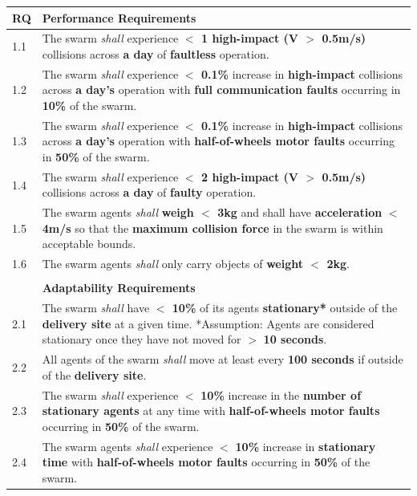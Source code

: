 \documentclass[runningheads]{llncs}
\begin{document}
\begin{table}[!t]
	\centering
	\begin{tabular}{p{5mm} p{120mm} }
		\textbf{RQ} & \textbf{Performance Requirements}\\
		\hline
		1.1 & The swarm \emph{shall} experience \textbf{$<$ 1 high-impact (V $>$ 0.5m/s)} collisions across \textbf{a day} of \textbf{faultless} operation. \\ 
		\hline
		1.2 & The swarm \emph{shall} experience \textbf{$<$ 0.1\%} increase in \textbf{high-impact} collisions across \textbf{a day's} operation with \textbf{full communication faults} occurring in \textbf{10\%} of the swarm.\\ 
		\hline
		1.3 & The swarm \emph{shall} experience \textbf{$<$ 0.1\%} increase in \textbf{high-impact} collisions across \textbf{a day's} operation with \textbf{half-of-wheels motor faults} occurring in \textbf{50\%} of the swarm.	\\	
		\hline
		1.4 & The swarm \emph{shall} experience \textbf{$<$ 2 high-impact (V $>$ 0.5m/s)} collisions across \textbf{a day} of \textbf{faulty} operation.  \\		 		
		\hline
        1.5 & The swarm agents \emph{shall} \textbf{weigh $<$ 3kg} and shall have \textbf{acceleration} \textbf{$<$ 4m/s} so that the \textbf{maximum collision force} in the swarm is within acceptable bounds. \\
        \hline
        1.6 & The swarm agents \emph{shall} only carry objects of \textbf{weight $<$ 2kg}. \\ 
        \hline \\[-1.25\medskipamount]
		& \textbf{Adaptability Requirements}\\
		\hline
		2.1 & The swarm \emph{shall} have \textbf{$<$ 10\%} of its agents \textbf{stationary*} outside of the \textbf{delivery site} at a given time.
		*Assumption: Agents are considered stationary once they have not moved for $>$ \textbf{10 seconds}.
		\\ 
		\hline
		2.2 & All agents of the swarm \emph{shall} move at least every \textbf{100 seconds} if outside of the \textbf{delivery site}.\\ 
		\hline
		2.3 & The swarm \emph{shall} experience $<$ \textbf{10\%} increase in the \textbf{number of stationary agents} at any time with \textbf{half-of-wheels motor faults} occurring in \textbf{50\%} of the swarm. \\
		\hline
		2.4 & The swarm agents \emph{shall} experience $<$ \textbf{10\%} increase in \textbf{stationary time} with \textbf{half-of-wheels motor faults} occurring in \textbf{50\%} of  the swarm.\\ 

\end{tabular}
\end{table}
\end{document}
